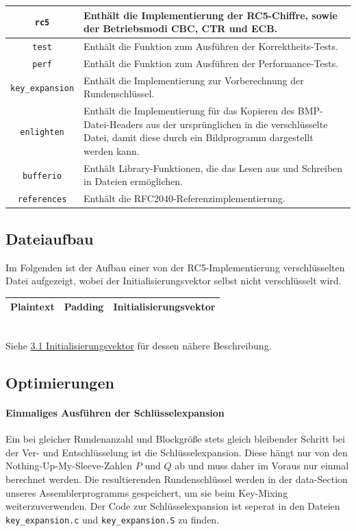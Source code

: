 \documentclass[course=erap]{aspdoc}
\begin{document}
\begin{center}
\begin{tabular}{ |c|m{11.2cm}| }
\hline
\texttt{rc5} & Enthält die Implementierung der RC5-Chiffre, sowie der Betriebsmodi CBC, CTR und ECB. \\
\hline
\texttt{test} & Enthält die Funktion zum Ausführen der Korrektheits-Tests. \\
\hline
\texttt{perf} & Enthält die Funktion zum Ausführen der Performance-Tests. \\
\hline
\texttt{key\_expansion} & Enthält die Implementierung zur Vorberechnung der Rundenschlüssel. \\
\hline
\texttt{enlighten} & Enthält die Implementierung für das Kopieren des BMP-Datei-Headers aus der ursprünglichen in die verschlüsselte Datei, damit diese durch ein Bildprogramm dargestellt werden kann. \\
\hline
\texttt{bufferio} & Enthält Library-Funktionen, die das Lesen aus und Schreiben in Dateien ermöglichen. \\
\hline
\texttt{references} & Enthält die RFC2040-Referenzimplementierung. \\
\hline
\end{tabular}
\end{center}

\subsection{Dateiaufbau}
Im Folgenden ist der Aufbau einer von der RC5-Implementierung verschlüsselten Datei aufgezeigt,
wobei der Initialisierungsvektor selbst nicht verschlüsselt wird.\\[1.5mm]
\begin{tabularx}{\textwidth}{|X|X|X|}
    \hline
    \centering Plaintext & \centering Padding & \centering\arraybackslash Initialisierungsvektor\\
    \hline
\end{tabularx}\\[1.5mm]
Siehe \hyperref[sec:Initialisierungsvektor]{3.1 Initialisierungsvektor} für dessen nähere
Beschreibung.

\subsection{Optimierungen}

\paragraph{Einmaliges Ausführen der Schlüsselexpansion} Ein bei gleicher Rundenanzahl und Blockgröße stets gleich bleibender Schritt bei der Ver- und Entschlüsselung ist die Schlüsselexpansion. Diese hängt nur von den Nothing-Up-My-Sleeve-Zahlen $P$ und $Q$ ab und muss daher im Voraus nur einmal berechnet werden. Die resultierenden Rundenschlüssel werden in der data-Section unseres Assemblerprogramms gespeichert, um sie beim Key-Mixing weiterzuverwenden. Der Code zur Schlüsselexpansion ist seperat in den Dateien \texttt{key\_expansion.c} und \texttt{key\_expansion.S} zu finden.
\end{document}
